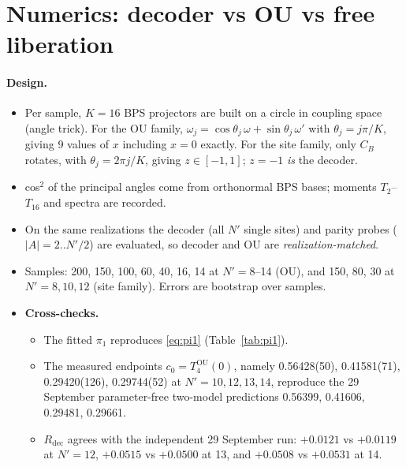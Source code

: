 \documentclass[11pt]{article}
\newcommand{\Np}{N'}
\newcommand{\OU}{\mathrm{OU}}
\newcommand{\dec}{\mathrm{dec}}
\theoremstyle{remark}
\begin{document}
\section{Numerics: decoder vs OU vs free liberation}\label{sec:numerics}
\paragraph{Design.}
\begin{itemize}\itemsep1pt
\item Per sample, $K=16$ BPS projectors are built on a circle in coupling space (angle trick). For the OU family,
  $\omega_j=\cos\theta_j\,\omega+\sin\theta_j\,\omega'$ with $\theta_j=j\pi/K$, giving 9 values of $x$ including $x=0$
  exactly. For the site family, only $C_B$ rotates, with $\theta_j=2\pi j/K$, giving $z\in[-1,1]$; $z=-1$ \emph{is} the
  decoder.
\item cos$^2$ of the principal angles come from orthonormal BPS bases; moments $T_2$--$T_{16}$ and spectra are recorded.
\item On the same realizations the decoder (all $\Np$ single sites) and parity probes ($|A|=2..\Np/2$) are evaluated, so
  decoder and OU are \emph{realization-matched}.
\item Samples: 200, 150, 100, 60, 40, 16, 14 at $\Np=8$--14 (OU), and 150, 80, 30 at $\Np=8,10,12$ (site family).
  Errors are bootstrap over samples.
\item \textbf{Cross-checks.}
  \begin{itemize}\itemsep1pt
  \item The fitted $\pi_1$ reproduces \eqref{eq:pi1} (Table~\ref{tab:pi1}).
  \item The measured endpoints $c_0=T_4^\OU(0)$, namely 0.56428(50), 0.41581(71), 0.29420(126), 0.29744(52) at
    $\Np=10,12,13,14$, reproduce the 29 September parameter-free two-model predictions 0.56399, 0.41606, 0.29481,
    0.29661.
  \item $R_\dec$ agrees with the independent 29 September run: $+0.0121$ vs $+0.0119$ at $\Np=12$, $+0.0515$ vs $+0.0500$
    at 13, and $+0.0508$ vs $+0.0531$ at 14.
  \end{itemize}
\end{itemize}
\end{document}
